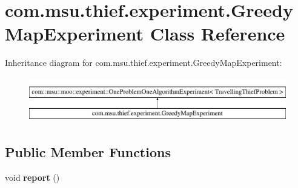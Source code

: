 \hypertarget{classcom_1_1msu_1_1thief_1_1experiment_1_1GreedyMapExperiment}{\section{com.\-msu.\-thief.\-experiment.\-Greedy\-Map\-Experiment Class Reference}
\label{classcom_1_1msu_1_1thief_1_1experiment_1_1GreedyMapExperiment}
}
Inheritance diagram for com.\-msu.\-thief.\-experiment.\-Greedy\-Map\-Experiment\-:\begin{figure}[H]
\begin{center}
\leavevmode
\includegraphics[height=2.000000cm]{classcom_1_1msu_1_1thief_1_1experiment_1_1GreedyMapExperiment}
\end{center}
\end{figure}
\subsection*{Public Member Functions}
\begin{DoxyCompactItemize}
\item 
\hypertarget{classcom_1_1msu_1_1thief_1_1experiment_1_1GreedyMapExperiment_acdc02b952bd9f3358cb2b336b7ec5b30}{void {\bfseries report} ()}\label{classcom_1_1msu_1_1thief_1_1experiment_1_1GreedyMapExperiment_acdc02b952bd9f3358cb2b336b7ec5b30}

\end{DoxyCompactItemize}
